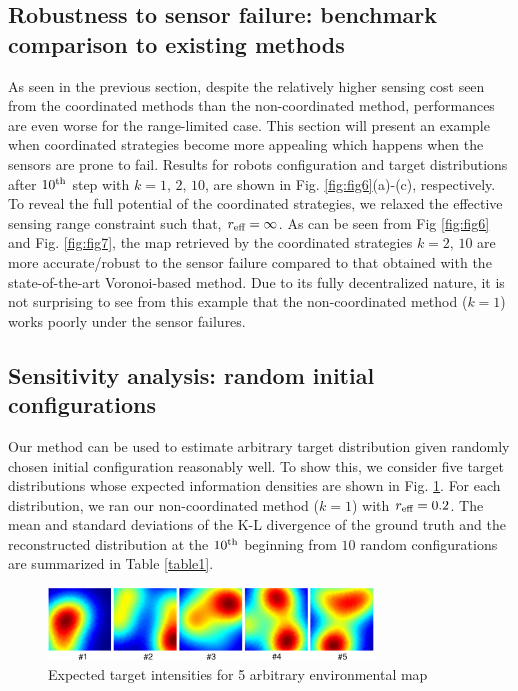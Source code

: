 \documentclass[letterpaper, 10 pt, conference]{ieeeconf}
\begin{document}
\subsection{Robustness to sensor failure: benchmark comparison to existing methods}
As seen in the previous section, 
despite the relatively higher sensing cost seen from the coordinated methods than the non-coordinated method, performances are even worse for the range-limited case. This section will present an example when coordinated strategies become more appealing which happens when the sensors are prone to fail. 
Results for robots configuration and target distributions after $10^{\textup{th}}$ step with $k=1,\,2,\,10$, are shown in Fig. \ref{fig:fig6}(a)-(c), respectively. To reveal the full potential of the coordinated strategies, we relaxed the effective sensing range constraint such that, $r_{\textup{eff}} = \infty$.
As can be seen from Fig \ref{fig:fig6} and Fig. \ref{fig:fig7}, the map retrieved by the coordinated strategies $k=2,\,10$ are more accurate/robust to the sensor failure compared to that obtained with the state-of-the-art Voronoi-based method. 
Due to its fully decentralized nature, it is not surprising to see from this example that the non-coordinated method ($k=1$) works poorly under the sensor failures. 

\subsection{Sensitivity analysis: random initial configurations}
Our method can be used to estimate arbitrary target distribution given randomly chosen initial configuration reasonably well. To show this, we consider five target distributions whose expected information densities are shown in Fig. \ref{fig:fig8}. 
For each distribution, we ran our non-coordinated method ($k=1$) with $r_{\textup{eff}} = 0.2$. 
The mean and standard deviations of the K-L divergence of the ground truth and the reconstructed distribution at the $10^{\textup{th}}$ beginning from $10$ random configurations are summarized in Table \ref{table1}.
\begin{figure}
	\centering
	\includegraphics[width=3.4in]{figure/fig8}
	\caption{Expected target intensities for 5 arbitrary environmental map} 
	\label{fig:fig8}
\end{figure}
\end{document}
